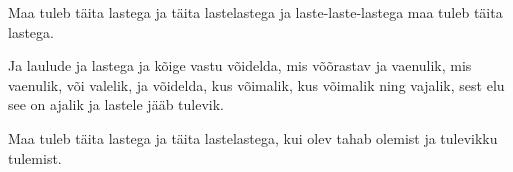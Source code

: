 Maa tuleb t\"aita lastega
ja t\"aita lastelastega
ja laste-laste-lastega
maa tuleb t\"aita lastega.

Ja laulude ja lastega
ja k\~oige vastu v\~oidelda,
mis v\~o\~orastav ja vaenulik,
mis vaenulik, v\~oi valelik,
ja v\~oidelda, kus v\~oimalik,
kus v\~oimalik ning vajalik,
sest elu see on ajalik
ja lastele j\"a\"ab tulevik.

Maa tuleb t\"aita lastega
ja t\"aita lastelastega,
kui olev tahab olemist ja
tulevikku tulemist. 